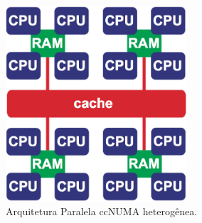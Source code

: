 \begin{frame}
    \begin{figure}[h]
    	\centering
    	\includegraphics[width=0.6\textwidth]{img/tobias/ccnuma.png}
    	\caption{Arquitetura Paralela ccNUMA heterogênea.}
    	\label{fig:ccnuma}
    \end{figure}
\end{frame}



%	
%
%
%
%
%


		
